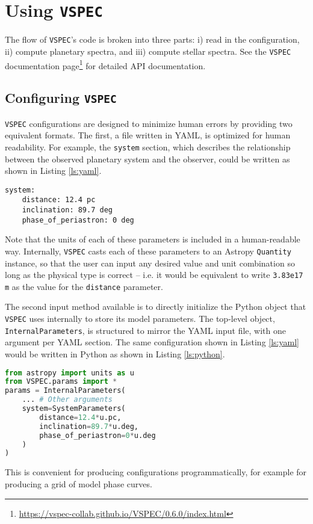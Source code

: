 \documentclass[twocolumn,linenumbers]{aastex631}
\newcommand{\vspec}[1]{\texttt{VSPEC}#1}
\begin{document}
\section{Using \vspec{}}
\label{sec:vspec}

The flow of \vspec{}'s code is broken into three parts: i) read in the configuration, ii) compute planetary spectra, and iii) compute stellar spectra.
See the \vspec{} documentation page\footnote{\href{https://vspec-collab.github.io/VSPEC/0.6.0/index.html}{https://vspec-collab.github.io/VSPEC/0.6.0/index.html}} for detailed API documentation.
\subsection{Configuring \vspec{}}
\label{subsec:config}

\vspec{} configurations are designed to minimize human errors by providing two equivalent formats. The first, a file written in YAML, is optimized for
human readability. For example, the \texttt{system} section, which describes the relationship between the observed planetary system and the observer, could
be written as shown in Listing \ref{ls:yaml}.
\begin{lstlisting}[label={ls:yaml},caption=\vspec{} YAML Configuration]
system:
    distance: 12.4 pc
    inclination: 89.7 deg
    phase_of_periastron: 0 deg
\end{lstlisting}
Note that the units of each of these parameters is included in a human-readable way. Internally, \vspec{} casts each of these parameters to an Astropy
\texttt{Quantity} instance, so that the user can input any desired value and unit combination so long as the physical type is correct -- i.e. it would be
equivalent to write \texttt{3.83e17 m} as the value for the \texttt{distance} parameter.

The second input method available is to directly initialize the Python object that \vspec{} uses internally to store its model parameters.
The top-level object, \texttt{InternalParameters}, is structured to mirror the YAML input file, with one argument per YAML section. The same
configuration shown in Listing \ref{ls:yaml} would be written in Python as shown in Listing \ref{ls:python}.
\begin{lstlisting}[language=Python, caption={\vspec{} Python configuration},label={ls:python}]
from astropy import units as u
from VSPEC.params import *
params = InternalParameters(
    ... # Other arguments
    system=SystemParameters(
        distance=12.4*u.pc,
        inclination=89.7*u.deg,
        phase_of_periastron=0*u.deg
    )
)
\end{lstlisting}
This is convenient for producing configurations programmatically, for example for producing a grid of model phase curves.
\end{document}
